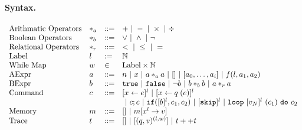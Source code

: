 \documentclass[a4paper,11pt]{article}
\begin{document}
\paragraph{Syntax.}
\[
\begin{array}{llll}
 \mbox{Arithmatic Operators} & *_a & ::= & + ~|~ - ~|~ \times 
%
~|~ \div \\  
  \mbox{Boolean Operators} & *_b & ::= & \lor ~|~ \land ~|~ \neg\\
   \mbox{Relational Operators} & *_r & ::= & < ~|~ \leq ~|~ = \\  
 \mbox{Label} & l & := & \mathbb{N} \\ 
 \mbox{While Map} & w & \in & \mbox{Label} \times \mathbb{N} \\
\mbox{AExpr} & \aexpr & ::= & 
	n ~|~ x ~|~ \aexpr *_a \aexpr ~|~ {[] ~|~ [\aexpr_0, \dots, \aexpr_i]  } \sep f (l , \aexpr_1, \aexpr_2) \\
\mbox{BExpr} & \bexpr & ::= & 
	\etrue ~|~ \efalse  ~|~ \neg \bexpr
	 ~|~ \bexpr *_b \bexpr
	~|~ \aexpr *_r \aexpr \\
\mbox{Command} & c & ::= &   [\assign x \expr]^{l} ~|~  [\assign x q(\expr)]^{l}
%
 \\
& & & ~|~  c ; c ~|~ \eif([\bexpr]^{l}, c_1, c_2) 
	 ~|~ [\eskip]^{l} \sep {\eloop ~ [\valr_N]^{l} ~ (c_1) ~ \edo ~ c_2 }
	\\
\mbox{Memory} & m & ::= & [] ~|~ m[x^{l} \to v] \\
%
\mbox{Trace} & t & ::= & [] ~|~ [(q, v)^{(l, w) }] ~|~ t ++ t
\end{array}
\]
%
%
\end{document}
